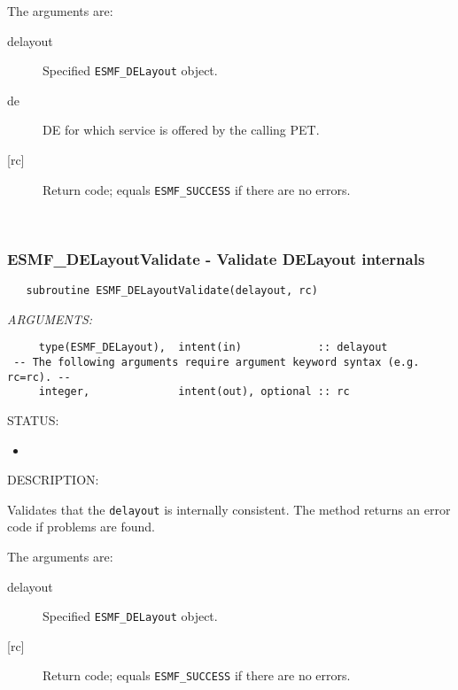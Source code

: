        The arguments are:
       \begin{description}
       \item[delayout] 
            Specified {\tt ESMF\_DELayout} object.
       \item[de]
            DE for which service is offered by the calling PET.
       \item[{[rc]}]
            Return code; equals {\tt ESMF\_SUCCESS} if there are no errors.
       \end{description}
   
 
\mbox{}\hrulefill\ 
 
\subsubsection [ESMF\_DELayoutValidate] {ESMF\_DELayoutValidate - Validate DELayout internals}


 
\begin{verbatim}   subroutine ESMF_DELayoutValidate(delayout, rc)\end{verbatim}{\em ARGUMENTS:}
\begin{verbatim}     type(ESMF_DELayout),  intent(in)            :: delayout
 -- The following arguments require argument keyword syntax (e.g. rc=rc). --
     integer,              intent(out), optional :: rc  \end{verbatim}
{\sf STATUS:}
   \begin{itemize}
   \item{}
   \end{itemize}
  
{\sf DESCRIPTION:\\ }


        Validates that the {\tt delayout} is internally consistent.
        The method returns an error code if problems are found.  
  
       The arguments are:
       \begin{description}
       \item[delayout] 
            Specified {\tt ESMF\_DELayout} object.
       \item[{[rc]}] 
            Return code; equals {\tt ESMF\_SUCCESS} if there are no errors.
       \end{description}
  
\setlength{\parskip}{\oldparskip}
\setlength{\parindent}{\oldparindent}
\setlength{\baselineskip}{\oldbaselineskip}
